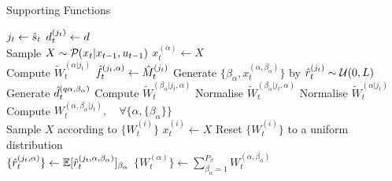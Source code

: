 \begin{algorithm}[H] %
	\caption{Supporting Functions}\label{algorithm:q-slamR:supportf}
	\begin{algorithmic}[0] 
		
		\State $j_t \gets \hat{s}_{ t}$
		\State $d^{( j_t )}_{t} \gets d$
		\EndFunction
		\\ \dotfill
		\State Sample $X \sim \mathcal{P}_{} ( x_{t}| x_{t-1}, u_{t-1} )$ 
		\State $x_{t}^{(\alpha)} \gets X$
		\EndFor
		\EndFunction
		\\ \dotfill
		\State Compute $\tilde{W}_t^{( \alpha | j_t)} $ 
		\State $\hat{f}^{( j_t, \alpha )}_{t} \gets \hat{M}^{(j_t)}_t$ 
		\State Generate $\{\beta_\alpha, x_t^{(\alpha, \beta_\alpha)} \} $ by $\hat{r}^{( j_t )}_{t} \sim \mathcal{U}(0,L) $ 
		\State Generate $\hat{d}^{( q \alpha, \beta_\alpha )}_{t}$ 
		\State Compute $\tilde{W}_t^{( \beta_\alpha | j_t, \alpha)}$ 
		\EndFor
		\State Normalise $\tilde{W}_t^{( \beta_\alpha | j_t, \alpha)}$ 
		\EndFor
		\State Normalise $\tilde{W}_t^{( \alpha | j_t)}$ 
		\State Compute $W_t^{(\alpha, \beta_\alpha |j_t)}, \quad \forall \{\alpha, \{\beta_\alpha\} \}$
		\EndFunction 
		\\ \dotfill
		\State Sample $X$  according to $\{W_t^{(i)}\}$
		\State $x_t^{(i)} \gets X$
		\EndFor
		\State Reset $\{W_t^{(i)}\}$ to a uniform distribution
		\EndFunction 
		\\ \dotfill
		\State $\{\hat{r}^{( j_t, \alpha )}_{t}\} \gets \mathbb{E}[\hat{r}^{( j_t, \alpha, \beta_\alpha )}_{t}]_{\beta_\alpha}$
		\State $\{ W_t^{(\alpha)}\}  \gets \sum_{\beta_\alpha =1 }^{P_\beta} W_t^{(\alpha, \beta_\alpha)} $
		\EndFunction 
	\end{algorithmic}
\end{algorithm}

